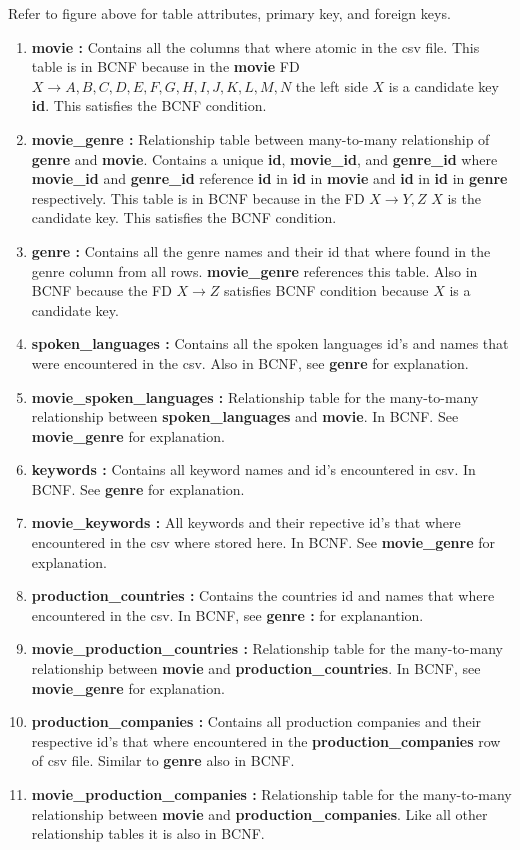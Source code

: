\documentclass[11pt]{article}
\begin{document}
Refer to figure above for table attributes, primary key, and foreign keys.

\begin{enumerate}
	\item{\textbf{movie :}}
		Contains all the columns that where atomic in the csv file.
		This table is in BCNF because in the \textbf{movie} FD
		$X \rightarrow A,B,C,D,E,F,G,H,I,J,K,L,M,N$
		the left side $X$ is a candidate key \textbf{id}. This satisfies
		the BCNF condition.
	\item{\textbf{movie\_genre :}}
		Relationship table between many-to-many relationship of
		\textbf{genre} and \textbf{movie}. Contains a unique
		\textbf{id}, \textbf{movie\_id}, and \textbf{genre\_id} where
		\textbf{movie\_id} and \textbf{genre\_id} reference \textbf{id}
		in \textbf{id} in \textbf{movie} and \textbf{id} in
		\textbf{id} in \textbf{genre} respectively. This table is
		in BCNF because in the FD $X \rightarrow Y,Z$ $X$ is the
		candidate key. This satisfies the BCNF condition.
	\item{\textbf{genre :}}
		Contains all the genre names and their id that where found
		in the genre column from all rows. \textbf{movie\_genre}
		references this table. Also in BCNF because the FD
		$X \rightarrow Z$ satisfies BCNF condition because $X$ is a
		candidate key.
	\item{\textbf{spoken\_languages :}}
		Contains all the spoken languages id's and names that were
		encountered in the csv. Also in BCNF, see \textbf{genre} for
		explanation.
	\item{\textbf{movie\_spoken\_languages :}}
		Relationship table for the many-to-many relationship between
		\textbf{spoken\_languages} and \textbf{movie}. In BCNF. See
		\textbf{movie\_genre} for explanation.
	\item{\textbf{keywords :}}
		Contains all keyword names and id's encountered in csv.
		In BCNF. See \textbf{genre} for explanation.
	\item{\textbf{movie\_keywords :}}
		All keywords and their repective id's that where encountered in
		the csv where stored here. In BCNF. See
		\textbf{movie\_genre} for explanation.
	\item{\textbf{production\_countries :}}
		Contains the countries id and names that where encountered in
		the csv. In BCNF, see \textbf{genre :} for explanantion.
	\item{\textbf{movie\_production\_countries :}}
		Relationship table for the many-to-many relationship between
		\textbf{movie} and \textbf{production\_countries}. In BCNF, see
		\textbf{movie\_genre} for explanation.
	\item{\textbf{production\_companies :}}
		Contains all production companies and their respective id's that
		where encountered in the \textbf{production\_companies} row of
		csv file. Similar to \textbf{genre} also in BCNF.
	\item{\textbf{movie\_production\_companies :}}
		Relationship table for the many-to-many relationship between
		\textbf{movie} and \textbf{production\_companies}. Like all
		other relationship tables it is also in BCNF.
\end{enumerate}
\end{document}

